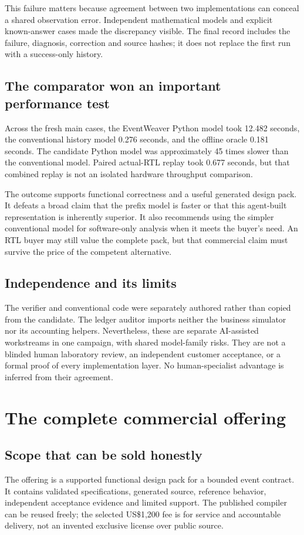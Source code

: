 This failure matters because agreement between two implementations can conceal a shared observation error. Independent mathematical models and explicit known-answer cases made the discrepancy visible. The final record includes the failure, diagnosis, correction and source hashes; it does not replace the first run with a success-only history.

\subsection{The comparator won an important performance test}
Across the fresh main cases, the EventWeaver Python model took 12.482 seconds, the conventional history model 0.276 seconds, and the offline oracle 0.181 seconds. The candidate Python model was approximately 45 times slower than the conventional model. Paired actual-RTL replay took 0.677 seconds, but that combined replay is not an isolated hardware throughput comparison.

The outcome supports functional correctness and a useful generated design pack. It defeats a broad claim that the prefix model is faster or that this agent-built representation is inherently superior. It also recommends using the simpler conventional model for software-only analysis when it meets the buyer's need. An RTL buyer may still value the complete pack, but that commercial claim must survive the price of the competent alternative.



\subsection{Independence and its limits}
The verifier and conventional code were separately authored rather than copied from the candidate. The ledger auditor imports neither the business simulator nor its accounting helpers. Nevertheless, these are separate AI-assisted workstreams in one campaign, with shared model-family risks. They are not a blinded human laboratory review, an independent customer acceptance, or a formal proof of every implementation layer. No human-specialist advantage is inferred from their agreement.

\section{The complete commercial offering}
\subsection{Scope that can be sold honestly}
The offering is a supported functional design pack for a bounded event contract. It contains validated specifications, generated source, reference behavior, independent acceptance evidence and limited support. The published compiler can be reused freely; the selected US\$1,200 fee is for service and accountable delivery, not an invented exclusive license over public source.


